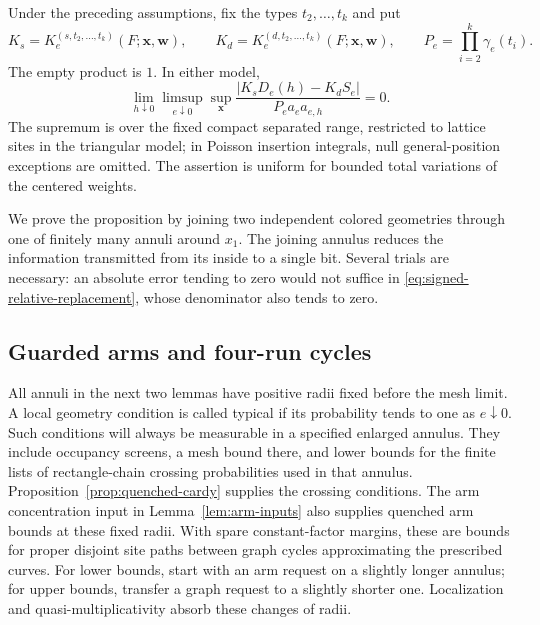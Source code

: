 \begin{proposition}
\label{prop:replacement}
Under the preceding assumptions, fix the types $t_2,\ldots,t_k$ and put
\[
 K_s=K_e^{(s,t_2,\ldots,t_k)}(F;\boldsymbol x,\boldsymbol w),\qquad
 K_d=K_e^{(d,t_2,\ldots,t_k)}(F;\boldsymbol x,\boldsymbol w),\qquad
 P_e=\prod_{i=2}^k \gamma_e(t_i).
\]
The empty product is $1$.  In either model,
\begin{equation}
 \lim_{h\downarrow0}\limsup_{e\downarrow0}
 \sup_{\boldsymbol x}
 \frac{|K_sD_e(h)-K_dS_e|}{P_e a_e a_{e,h}}=0.
 \label{eq:signed-relative-replacement}
\end{equation}
The supremum is over the fixed compact separated range, restricted to
lattice sites in the triangular model; in Poisson insertion integrals,
null general-position exceptions are omitted.  The assertion is uniform
for bounded total variations of the centered weights.
\end{proposition}

We prove the proposition by joining two independent colored geometries
through one of finitely many annuli around $x_1$.  The joining annulus
reduces the information transmitted from its inside to a single bit.
Several trials are necessary: an absolute error tending to zero would
not suffice in \eqref{eq:signed-relative-replacement}, whose denominator
also tends to zero.

\subsection{Guarded arms and four-run cycles}

All annuli in the next two lemmas have positive radii fixed before the
mesh limit.  A local geometry condition is called typical if its
probability tends to one as $e\downarrow0$.  Such conditions will always
be measurable in a specified enlarged annulus.  They include occupancy
screens, a mesh bound there, and lower bounds for the finite lists of
rectangle-chain crossing probabilities used in that annulus.
Proposition~\ref{prop:quenched-cardy} supplies the crossing conditions.
The arm concentration input in Lemma~\ref{lem:arm-inputs} also supplies
quenched arm bounds at these fixed radii.  With spare constant-factor
margins, these are bounds for proper disjoint site paths between graph
cycles approximating the prescribed curves.  For lower bounds, start
with an arm request on a slightly longer annulus; for upper bounds,
transfer a graph request to a slightly shorter one.  Localization and
quasi-multiplicativity absorb these changes of radii.

